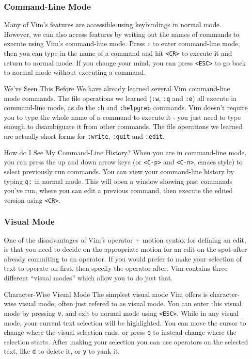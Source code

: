 \documentclass{beamer}
\begin{document}
\begin{frame}[fragile]
    \frametitle{Command-Line Mode}
    Many of Vim's features are accessible using keybindings in normal mode. However, we can also access features by writing out the names of commands to execute using Vim's command-line mode. Press \verb+:+ to enter command-line mode, then you can type in the name of a command and hit \verb+<CR>+ to execute it and return to normal mode. If you change your mind, you can press \verb+<ESC>+ to go back to normal mode without executing a command.\\
    \vspace{0.5cm}
    \begin{block}{We've Seen This Before}
	We have already learned several Vim command-line mode commands. The file operations we learned (\verb+:w+, \verb+:q+ and \verb+:e+) all execute in command-line mode, as do the \verb+:h+ and \verb+:helpgrep+ commands. Vim doesn't require you to type the whole name of a command to execute it - you just need to type enough to disambiguate it from other commands. The file operations we learned are actually short forms for \verb+:write+, \verb+:quit+ and \verb+:edit+.
    \end{block}
\end{frame}

\begin{frame}[fragile]
    \begin{block}{How do I See My Command-Line History?}
	When you are in command-line mode, you can press the up and down arrow keys (or \verb+<C-p>+ and \verb+<C-n>+, emacs style) to select previously run commands. You can view your command-line history by typing \verb+q:+ in normal mode. This will open a window showing past commands you've run, where you can edit a previous command, then execute the edited version using \verb+<CR>+.
    \end{block}
\end{frame}

\begin{frame}[fragile]
    \frametitle{Visual Mode}
    One of the disadvantages of Vim's operator + motion syntax for defining an edit, is that you need to decide on the appropriate motion for an edit on the spot after already commiting to an operator. If you would prefer to make your selection of text to operate on first, then specify the operator after, Vim contains three different \enquote{visual modes} which allow you to do just that.
    \begin{block}{Character-Wise Visual Mode}
	The simplest visual mode Vim offers is character-wise visual mode, often just refered to as visual mode. You can enter this visual mode by pressing \verb+v+, and exit to normal mode using \verb+<ESC>+. While in any visual mode, your current text selection will be highlighted. You can move the cursor to change where the visual selection ends, or press \verb+o+ to instead change where the selection starts. After making your selection you can use operators on the selected text, like \verb+d+ to delete it, or \verb+y+ to yank it.
    \end{block}
\end{frame}
\end{document}
